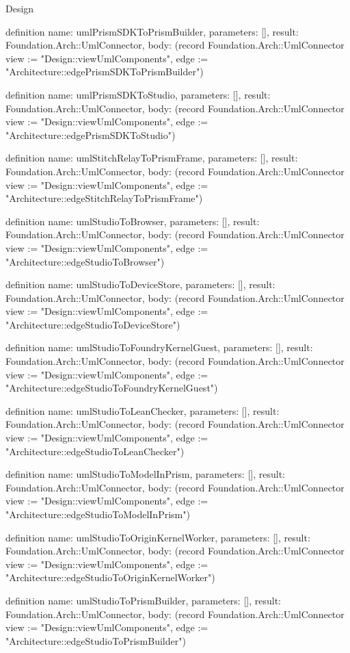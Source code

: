 \begin{lexlean}{Design}
\begin{semanticmodule}
definition{
  name: umlPrismSDKToPrismBuilder,
  parameters: [],
  result: Foundation.Arch::UmlConnector,
  body: (record Foundation.Arch::UmlConnector {view := "Design::viewUmlComponents", edge := "Architecture::edgePrismSDKToPrismBuilder"})
}

definition{
  name: umlPrismSDKToStudio,
  parameters: [],
  result: Foundation.Arch::UmlConnector,
  body: (record Foundation.Arch::UmlConnector {view := "Design::viewUmlComponents", edge := "Architecture::edgePrismSDKToStudio"})
}

definition{
  name: umlStitchRelayToPrismFrame,
  parameters: [],
  result: Foundation.Arch::UmlConnector,
  body: (record Foundation.Arch::UmlConnector {view := "Design::viewUmlComponents", edge := "Architecture::edgeStitchRelayToPrismFrame"})
}

definition{
  name: umlStudioToBrowser,
  parameters: [],
  result: Foundation.Arch::UmlConnector,
  body: (record Foundation.Arch::UmlConnector {view := "Design::viewUmlComponents", edge := "Architecture::edgeStudioToBrowser"})
}

definition{
  name: umlStudioToDeviceStore,
  parameters: [],
  result: Foundation.Arch::UmlConnector,
  body: (record Foundation.Arch::UmlConnector {view := "Design::viewUmlComponents", edge := "Architecture::edgeStudioToDeviceStore"})
}

definition{
  name: umlStudioToFoundryKernelGuest,
  parameters: [],
  result: Foundation.Arch::UmlConnector,
  body: (record Foundation.Arch::UmlConnector {view := "Design::viewUmlComponents", edge := "Architecture::edgeStudioToFoundryKernelGuest"})
}

definition{
  name: umlStudioToLeanChecker,
  parameters: [],
  result: Foundation.Arch::UmlConnector,
  body: (record Foundation.Arch::UmlConnector {view := "Design::viewUmlComponents", edge := "Architecture::edgeStudioToLeanChecker"})
}

definition{
  name: umlStudioToModelInPrism,
  parameters: [],
  result: Foundation.Arch::UmlConnector,
  body: (record Foundation.Arch::UmlConnector {view := "Design::viewUmlComponents", edge := "Architecture::edgeStudioToModelInPrism"})
}

definition{
  name: umlStudioToOriginKernelWorker,
  parameters: [],
  result: Foundation.Arch::UmlConnector,
  body: (record Foundation.Arch::UmlConnector {view := "Design::viewUmlComponents", edge := "Architecture::edgeStudioToOriginKernelWorker"})
}

definition{
  name: umlStudioToPrismBuilder,
  parameters: [],
  result: Foundation.Arch::UmlConnector,
  body: (record Foundation.Arch::UmlConnector {view := "Design::viewUmlComponents", edge := "Architecture::edgeStudioToPrismBuilder"})
}


\end{semanticmodule}
\end{lexlean}
